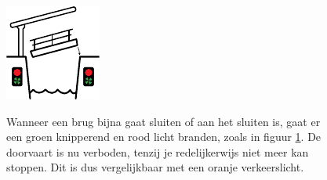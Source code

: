 \begin{figure}[H]
	\centering
	\begin{minipage}[b]{0.18\textwidth}
		\includegraphics[width=\textwidth]{Hoofdstukken/Bruggen/pdf/brug_sluitend.pdf}
		\caption{}
		\label{pic:brug:sluitend}
	\end{minipage}
	\hfill
	\begin{minipage}[t]{0.75\textwidth}
		\vspace{-2.5cm}
		Wanneer een brug bijna gaat sluiten of aan het sluiten is, gaat er een groen knipperend en rood licht branden, zoals in figuur \ref{pic:brug:sluitend}. De doorvaart is nu verboden, tenzij je redelijkerwijs niet meer kan stoppen. Dit is dus vergelijkbaar met een oranje verkeerslicht. 
	\end{minipage}
\end{figure}
\vspace{-0.75cm}
